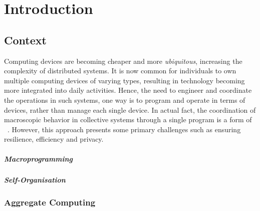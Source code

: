 
\chapter{Introduction}
\label{ch:introduction}
\section{Context}
\label{sec:context}

Computing devices are becoming cheaper and more \emph{ubiquitous}, increasing the complexity of distributed systems.
It is now common for individuals to own multiple computing devices of varying types,
resulting in technology becoming more integrated into daily activities.
Hence, the need to engineer and coordinate the operations in such systems, one way is to program and operate in terms of
     devices, rather than manage each single device.
In actual fact, the coordination of macroscopic behavior in collective systems through a single program is a form of
~.
However, this approach presents some primary challenges such as ensuring resilience, efficiency and privacy.

\paragraph{Macroprogramming}

\paragraph{Self-Organisation}

\subsection{Aggregate Computing}
\label{subsec:aggregate-computing}


